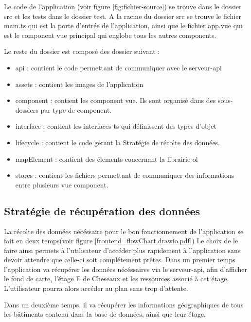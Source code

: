 \documentclass[
    iai, %
    il, %
]{heig-tb}
\begin{document}
Le code de l'application (voir figure \ref{fig:fichier-source}) se trouve dans le dossier src et les tests dans le dossier test.
A la racine du dossier src se trouve le fichier main.ts qui est la porte d'entrée de l'application,
ainsi que le fichier app.vue qui est le component vue principal qui englobe tous les autres components.

Le reste du dossier est composé des dossier suivant :
\begin{itemize}
    \item api : contient le code permettant de communiquer avec le serveur-api
    \item assets : contient les images de l'application
    \item component : contient les component vue. Ils sont organisé dans des sous-dossiers par type de component.
    \item interface : contient les interfaces \gls{ts} qui définissent des types d'objet
    \item lifecycle : contient le code gérant la Stratégie de récolte des données.
    \item mapElement : contient des élements concernant la librairie \gls{ol}
    \item stores : contient les fichiers permettant de communiquer des informations entre plusieurs vue component.
\end{itemize}

\subsection{Stratégie de récupération des données}


La récolte des données nécéssaire pour le bon fonctionnement de l'application se fait en deux temps(voir figure \ref{frontend_flowChart.drawio.pdf})
Le choix de le faire ainsi permets à l'utilisateur d'accéder plus rapidement à l'application sans devoir attendre que celle-ci soit complétement prêtes.
Dans un premier temps l'application va récupérer les données nécéssaires via le serveur-api,
afin d'afficher le fond de carte, l'étage E de Cheseaux et les ressources associé à cet étage.
L'utilisateur pourra alors accéder au plan sans trop d'attente.

Dans un deuxième temps, il va récupérer les informations géographiques de tous les bâtiments contenu dans la base de données,
ainsi que leur étage.
\end{document}
